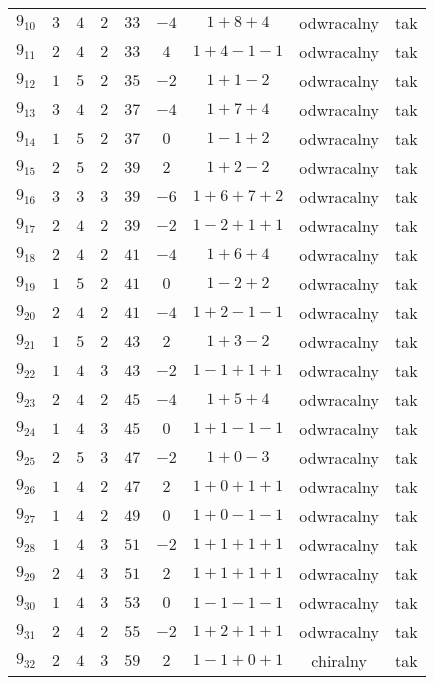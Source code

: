 \begin{longtable}{ccccccccc}
$9_{10}$ & $3$ & $4$ & $2$ & $33$ & $-4$ & $1+8+4$ & odwracalny & tak \\
$9_{11}$ & $2$ & $4$ & $2$ & $33$ & $4$ & $1+4-1-1$ & odwracalny & tak \\
$9_{12}$ & $1$ & $5$ & $2$ & $35$ & $-2$ & $1+1-2$ & odwracalny & tak \\
$9_{13}$ & $3$ & $4$ & $2$ & $37$ & $-4$ & $1+7+4$ & odwracalny & tak \\
$9_{14}$ & $1$ & $5$ & $2$ & $37$ & $0$ & $1-1+2$ & odwracalny & tak \\
$9_{15}$ & $2$ & $5$ & $2$ & $39$ & $2$ & $1+2-2$ & odwracalny & tak \\
$9_{16}$ & $3$ & $3$ & $3$ & $39$ & $-6$ & $1+6+7+2$ & odwracalny & tak \\
$9_{17}$ & $2$ & $4$ & $2$ & $39$ & $-2$ & $1-2+1+1$ & odwracalny & tak \\
$9_{18}$ & $2$ & $4$ & $2$ & $41$ & $-4$ & $1+6+4$ & odwracalny & tak \\
$9_{19}$ & $1$ & $5$ & $2$ & $41$ & $0$ & $1-2+2$ & odwracalny & tak \\
$9_{20}$ & $2$ & $4$ & $2$ & $41$ & $-4$ & $1+2-1-1$ & odwracalny & tak \\
$9_{21}$ & $1$ & $5$ & $2$ & $43$ & $2$ & $1+3-2$ & odwracalny & tak \\
$9_{22}$ & $1$ & $4$ & $3$ & $43$ & $-2$ & $1-1+1+1$ & odwracalny & tak \\
$9_{23}$ & $2$ & $4$ & $2$ & $45$ & $-4$ & $1+5+4$ & odwracalny & tak \\
$9_{24}$ & $1$ & $4$ & $3$ & $45$ & $0$ & $1+1-1-1$ & odwracalny & tak \\
$9_{25}$ & $2$ & $5$ & $3$ & $47$ & $-2$ & $1+0-3$ & odwracalny & tak \\
$9_{26}$ & $1$ & $4$ & $2$ & $47$ & $2$ & $1+0+1+1$ & odwracalny & tak \\
$9_{27}$ & $1$ & $4$ & $2$ & $49$ & $0$ & $1+0-1-1$ & odwracalny & tak \\
$9_{28}$ & $1$ & $4$ & $3$ & $51$ & $-2$ & $1+1+1+1$ & odwracalny & tak \\
$9_{29}$ & $2$ & $4$ & $3$ & $51$ & $2$ & $1+1+1+1$ & odwracalny & tak \\
$9_{30}$ & $1$ & $4$ & $3$ & $53$ & $0$ & $1-1-1-1$ & odwracalny & tak \\
$9_{31}$ & $2$ & $4$ & $2$ & $55$ & $-2$ & $1+2+1+1$ & odwracalny & tak \\
$9_{32}$ & $2$ & $4$ & $3$ & $59$ & $2$ & $1-1+0+1$ & chiralny & tak \\

\end{longtable}
